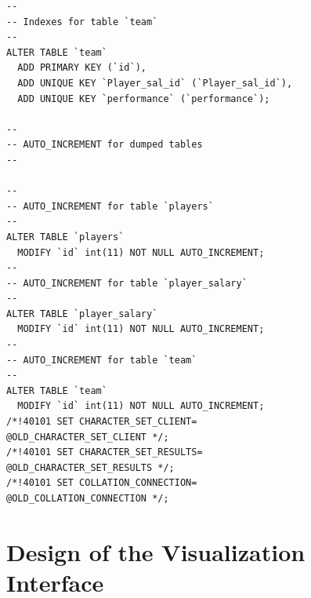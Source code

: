 \documentclass[journal]{vgtc}                %
\begin{document}
\begin{lstlisting}
--
-- Indexes for table `team`
--
ALTER TABLE `team`
  ADD PRIMARY KEY (`id`),
  ADD UNIQUE KEY `Player_sal_id` (`Player_sal_id`),
  ADD UNIQUE KEY `performance` (`performance`);

--
-- AUTO_INCREMENT for dumped tables
--

--
-- AUTO_INCREMENT for table `players`
--
ALTER TABLE `players`
  MODIFY `id` int(11) NOT NULL AUTO_INCREMENT;
--
-- AUTO_INCREMENT for table `player_salary`
--
ALTER TABLE `player_salary`
  MODIFY `id` int(11) NOT NULL AUTO_INCREMENT;
--
-- AUTO_INCREMENT for table `team`
--
ALTER TABLE `team`
  MODIFY `id` int(11) NOT NULL AUTO_INCREMENT;
/*!40101 SET CHARACTER_SET_CLIENT=
@OLD_CHARACTER_SET_CLIENT */;
/*!40101 SET CHARACTER_SET_RESULTS=
@OLD_CHARACTER_SET_RESULTS */;
/*!40101 SET COLLATION_CONNECTION=
@OLD_COLLATION_CONNECTION */;

\end{lstlisting}

\section{Design of the Visualization Interface}



\end{document}
